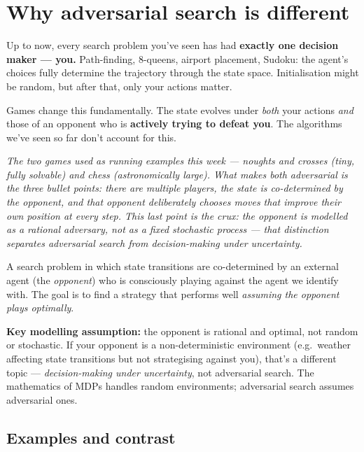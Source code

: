 \documentclass[11pt, a4paper]{article}
\begin{document}
\section{Why adversarial search is different}

Up to now, every search problem you've seen has had \textbf{exactly one decision maker — you.} Path-finding, 8-queens, airport placement, Sudoku: the agent's choices fully determine the trajectory through the state space. Initialisation might be random, but after that, only your actions matter.

Games change this fundamentally. The state evolves under \emph{both} your actions \emph{and} those of an opponent who is \textbf{actively trying to defeat you}. The algorithms we've seen so far don't account for this.

\begin{center}

\footnotesize\textit{The two games used as running examples this week — noughts and crosses (tiny, fully solvable) and chess (astronomically large). What makes both \emph{adversarial} is the three bullet points: there are multiple players, the state is co-determined by the opponent, and that opponent deliberately chooses moves that improve their own position at every step. This last point is the crux: the opponent is modelled as a rational adversary, not as a fixed stochastic process — that distinction separates adversarial search from decision-making under uncertainty.}
\end{center}

\begin{defbox}
A search problem in which state transitions are co-determined by an external agent (the \emph{opponent}) who is consciously playing against the agent we identify with. The goal is to find a strategy that performs well \emph{assuming the opponent plays optimally}.
\end{defbox}

\textbf{Key modelling assumption:} the opponent is rational and optimal, not random or stochastic. If your opponent is a non-deterministic environment (e.g.\ weather affecting state transitions but not strategising against you), that's a different topic — \emph{decision-making under uncertainty}, not adversarial search. The mathematics of MDPs handles random environments; adversarial search assumes adversarial ones.

\subsection{Examples and contrast}
\end{document}
